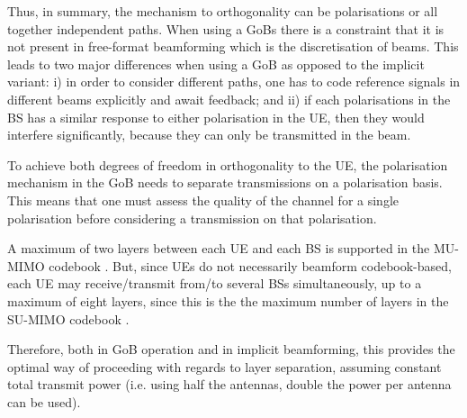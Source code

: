 
Thus, in summary, the mechanism to orthogonality can be polarisations or all together independent paths. When using a GoBs there is a constraint that it is not present in free-format beamforming which is the discretisation of beams. This leads to two major differences when using a GoB as opposed to the implicit variant: i) in order to consider different paths, one has to code reference signals in different beams explicitly and await feedback; and ii) if each polarisations in the BS has a similar response to either polarisation in the UE, then they would interfere significantly, because they can only be transmitted in the beam.

To achieve both degrees of freedom in orthogonality to the UE, the polarisation mechanism in the GoB needs to separate transmissions on a polarisation basis. This means that one must assess the quality of the channel for a single polarisation before considering a transmission on that polarisation. 


A maximum of two layers between each UE and each BS is supported in the MU-MIMO codebook \cite{3gpp-codebooks}. But, since UEs do not necessarily beamform codebook-based, each UE may receive/transmit from/to several BSs simultaneously, up to a maximum of eight layers, since this is the the maximum number of layers in the SU-MIMO codebook \cite{3gpp-codebooks}.


Therefore, both in GoB operation and in implicit beamforming, this provides the optimal way of proceeding with regards to layer separation, assuming constant total transmit power (i.e. using half the antennas, double the power per antenna can be used).



















